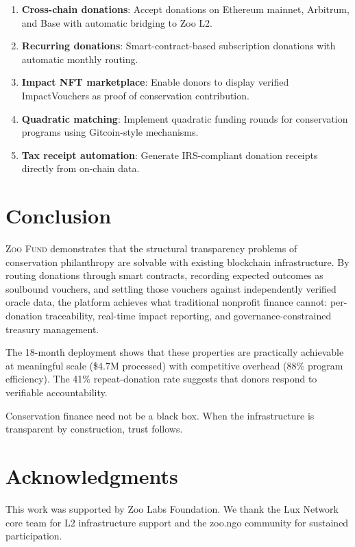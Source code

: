 \documentclass[11pt,letterpaper]{article}
\newcommand{\ZooFund}{\textsc{Zoo Fund}}
\begin{document}
\begin{enumerate}
    \item \textbf{Cross-chain donations}: Accept donations on Ethereum mainnet, Arbitrum, and Base with automatic bridging to Zoo L2.
    \item \textbf{Recurring donations}: Smart-contract-based subscription donations with automatic monthly routing.
    \item \textbf{Impact NFT marketplace}: Enable donors to display verified ImpactVouchers as proof of conservation contribution.
    \item \textbf{Quadratic matching}: Implement quadratic funding rounds for conservation programs using Gitcoin-style mechanisms.
    \item \textbf{Tax receipt automation}: Generate IRS-compliant donation receipts directly from on-chain data.
\end{enumerate}

\section{Conclusion}

\ZooFund{} demonstrates that the structural transparency problems of conservation philanthropy are solvable with existing blockchain infrastructure. By routing donations through smart contracts, recording expected outcomes as soulbound vouchers, and settling those vouchers against independently verified oracle data, the platform achieves what traditional nonprofit finance cannot: per-donation traceability, real-time impact reporting, and governance-constrained treasury management.

The 18-month deployment shows that these properties are practically achievable at meaningful scale (\$4.7M processed) with competitive overhead (88\% program efficiency). The 41\% repeat-donation rate suggests that donors respond to verifiable accountability.

Conservation finance need not be a black box. When the infrastructure is transparent by construction, trust follows.

\section*{Acknowledgments}

This work was supported by Zoo Labs Foundation. We thank the Lux Network core team for L2 infrastructure support and the zoo.ngo community for sustained participation.
\end{document}
